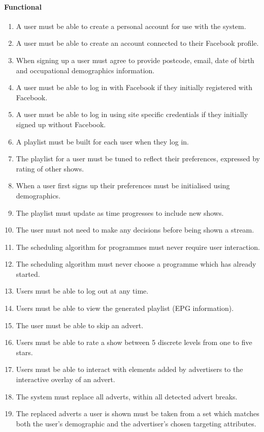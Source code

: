 	\paragraph{Functional}
		\begin{enumerate}
			\item{A user must be able to create a personal account for use with the system.}
			\item{A user must be able to create an account connected to their Facebook profile.}
			\item{When signing up a user must agree to provide postcode, email, date of birth and occupational demographics information.}
			\item{A user must be able to log in with Facebook if they initially registered with Facebook.}
			\item{A user must be able to log in using site specific credentials if they initially signed up without Facebook.}
			\item{A playlist must be built for each user when they log in.}
			\item{The playlist for a user must be tuned to reflect their preferences, expressed by rating of other shows.}
			\item{When a user first signs up their preferences must be initialised using demographics.}
			\item{The playlist must update as time progresses to include new shows.}
			\item{The user must not need to make any decisions before being shown a stream.}
			\item{The scheduling algorithm for programmes must never require user interaction.}
			\item{The scheduling algorithm must never choose a programme which has already started.}
			\item{Users must be able to log out at any time.}
			\item{Users must be able to view the generated playlist (EPG information).}
			\item{The user must be able to skip an advert.}
			\item{Users must be able to rate a show between 5 discrete levels from one to five stars.}
			\item{Users must be able to interact with elements added by advertisers to the interactive overlay of an advert.}
			\item{The system must replace all adverts, within all detected advert breaks.}
			\item{The replaced adverts a user is shown must be taken from a set which matches both the user's demographic and the advertiser's chosen targeting attributes.}

\end{enumerate}
